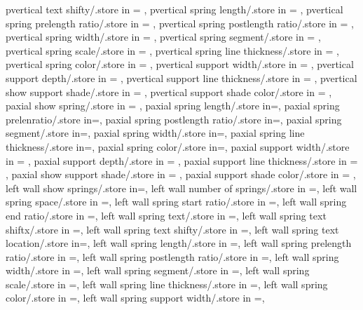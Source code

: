 {  pvertical text shifty/.store in = \pvertextshifty,
  pvertical spring length/.store in = \pverspringlength,
  pvertical spring prelength ratio/.store in = \pverprelenratio,
  pvertical spring postlength ratio/.store in = \pverpostlenratio,
  pvertical spring width/.store in = \pverampl,
  pvertical spring segment/.store in = \pversegm,
  pvertical spring scale/.store in = \pverspringscale,
  pvertical spring line thickness/.store in = \pverspringthk,
  pvertical spring color/.store in = \pverspringcolor,
  pvertical support width/.store in = \pversuppwidth,
  pvertical support depth/.store in = \pversuppdepth,
  pvertical support line thickness/.store in = \pversupplinethk,
  pvertical show support shade/.store in = \pvershowsuppshade,
  pvertical support shade color/.store in = \pversuppshadecol,
  paxial show spring/.store in = \showpaxialspring,
  paxial spring length/.store in=\paxialspringlength,
  paxial spring prelenratio/.store in=\paxialspringprelenratio,
  paxial spring postlength ratio/.store in=\paxialspringpostlenratio,
  paxial spring segment/.store in=\paxialspringsegm,
  paxial spring width/.store in=\paxialspringwidth,
  paxial spring line thickness/.store in=\paxialspringlinethk,
  paxial spring color/.store in=\paxialspringcolor,
  paxial support width/.store in = \paxialsuppwidth,
  paxial support depth/.store in = \paxialsuppdepth,
  paxial support line thickness/.store in = \paxialsupplinethk,
  paxial show support shade/.store in = \paxialshowsuppshade,
  paxial support shade color/.store in = \paxialsuppshadecol,
  left wall show springs/.store in=\leftwshowsprings,
  left wall number of springs/.store in =\leftwspringnumber,
  left wall spring space/.store in =\leftwspringspace,
  left wall spring start ratio/.store in =\leftwspringstartratio,
  left wall spring end ratio/.store in =\leftwspringendratio,
  left wall spring text/.store in =\leftwspringtext,
  left wall spring text shiftx/.store in =\leftwtextshiftx,
  left wall spring text shifty/.store in =\leftwtextshifty,
  left wall spring text location/.store in=\leftwspringtextloc,
  left wall spring length/.store in =\leftwspringlength,
  left wall spring prelength ratio/.store in =\leftwprelenratio,
  left wall spring postlength ratio/.store in =\leftwpostlenratio,
  left wall spring width/.store in =\leftwampl,
  left wall spring segment/.store in =\leftwsegm,
  left wall spring scale/.store in =\leftwspringscale,
  left wall spring line thickness/.store in =\leftwspringthk,
  left wall spring color/.store in =\leftwspringcolor,
  left wall spring support width/.store in =\leftwsuppwidth,
}
